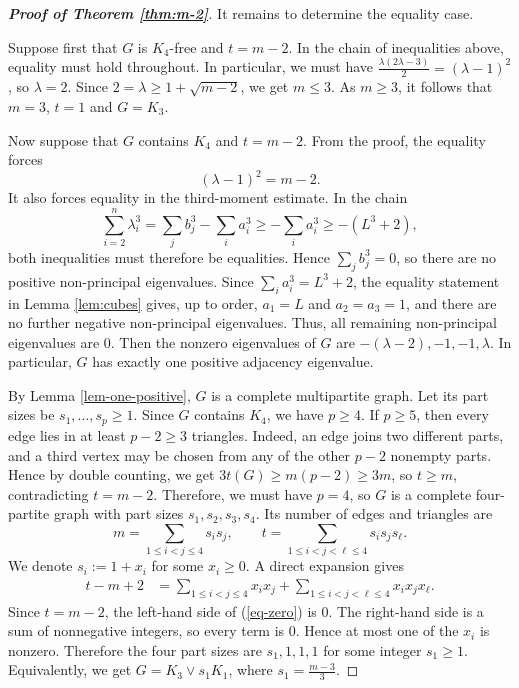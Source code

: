 \documentclass[11pt,a4paper]{article}
\theoremstyle{definition}
\theoremstyle{plain}
\renewcommand{\le}{\leqslant}
\renewcommand{\ge}{\geqslant}
\begin{document}
\begin{proof}[{\bf Proof of Theorem \ref{thm:m-2}}]
\smallskip 
It remains to determine the equality case.  

Suppose first that $G$ is
$K_4$-free and $t=m-2$.  In the chain of inequalities above, equality must hold
throughout.  In particular,
we must have $   \frac{\lambda(2\lambda-3)}{2}=(\lambda-1)^2$, 
so $\lambda=2$.  Since
$  2=\lambda\ge 1+\sqrt{m-2}$, 
we get $m\le 3$.  As $m\ge 3$, it follows that $m=3$, $t=1$ and $G=K_3$.

Now suppose that $G$ contains $K_4$ and $t=m-2$.  From the proof, the equality forces
\[
        (\lambda-1)^2=m-2. 
\]
It also forces equality in the third-moment estimate.  In the chain
\[
        \sum_{i=2}^n\lambda_i^3
        =
        \sum_j b_j^3-\sum_i a_i^3
        \ge
        -\sum_i a_i^3
        \ge
        -(L^3+2),
\]
both inequalities must therefore be equalities.  Hence $ \sum_j b_j^3=0$, 
so there are no positive non-principal eigenvalues.  Since $ \sum_i a_i^3=L^3+2$,  
 the equality statement in Lemma \ref{lem:cubes} gives, up to order,  
$ a_1=L$ and $a_2=a_3=1$, 
and there are no further negative non-principal eigenvalues. Thus, all
remaining non-principal eigenvalues are $0$.  Then the nonzero eigenvalues
of $G$ are $-(\lambda-2), -1,-1,\lambda$.  
In particular, $G$ has exactly one positive adjacency eigenvalue.

By Lemma \ref{lem-one-positive}, 
$G$ is a complete multipartite graph.  Let its part sizes be $  s_1,\dots,s_p \ge 1$. 
Since $G$ contains $K_4$, we have $p\ge 4$. 
If $p\ge 5$, then every edge lies in at least $p-2\ge 3$ triangles. Indeed, an
edge joins two different parts, and a third vertex may be chosen from any of
the other $p-2$ nonempty parts.  Hence
by double counting, we get $3t(G)\ge m(p-2)\ge 3m$, so $t\ge m$, contradicting $t=m-2$.  Therefore, we must have $p=4$, so $G$ is a complete four-partite graph
with part sizes $s_1,s_2,s_3,s_4$.  Its number of edges and triangles are
\[
        m=\sum_{1\le i<j\le 4}s_is_j,
        \qquad
        t=\sum_{1\le i<j<\ell\le 4}s_is_js_\ell.
\]
We denote $ s_i:=1+x_i$ for some $ x_i\ge 0$. 
A direct expansion gives
\begin{equation} \label{eq-zero}
\begin{aligned}
        t-m+2
        &=
        \sum_{1\le i<j\le 4}x_ix_j
        +
        \sum_{1\le i<j<\ell\le 4}x_ix_jx_\ell .
\end{aligned}
\end{equation}
Since $t=m-2$, the left-hand side of (\ref{eq-zero}) is $0$.  The right-hand side is a sum
of nonnegative integers, so every term is $0$.  Hence at most one of the
$x_i$ is nonzero.  Therefore the four part sizes are $s_1,1,1,1$ 
for some integer $s_1\ge 1$.  Equivalently, we get $G= K_3\vee s_1K_1$, where $s_1=\frac{m-3}{3}$. 
\end{proof}
\end{document}
